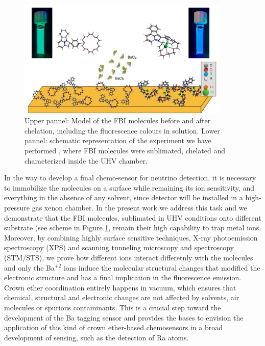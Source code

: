 \documentclass[aps,prl,reprint,longbibliography,superscriptaddress]{revtex4-1}
\def\Ba{Ba$^{+2}$ }
\begin{document}
 \begin{figure}[ht!]
	\includegraphics[width=0.9\textwidth]{figures/fig1_fbi_model.pdf}
	\caption{\label{ModeloFBI} 
    Upper pannel: Model of the FBI molecules before and after chelation, including the fluorescence colours in solution. Lower pannel: schematic representation of the experiment we have performed , where FBI molecules were sublimated, chelated and characterized inside the UHV chamber.}
\end{figure}  

 In the way to develop a final chemo-sensor for neutrino detection, it is necessary to immobilize the molecules on a surface while remaining its ion sensitivity, and everything in the absence of any solvent, since detector will be installed in a high-pressure gas xenon chamber. In the present work we address this task and we demonstrate that the FBI molecules, sublimated in UHV conditions onto different substrate (see scheme in Figure \ref{ModeloFBI}, remain their high capability to trap metal ions. Moreover, by combining highly surface sensitive techniques, X-ray photoemission spectroscopy (XPS) and scanning tunneling microscopy and spectroscopy (STM/STS), we prove how different ions interact differetnly with the molecules and only the \Ba ions induce the molecular structural changes that modified the electronic structure and has a final implication in the fluorescence emission. Crown ether coordination entirely happens in vacuum, which ensures that chemical, structural and electronic changes are not affected by solvents, air molecules or spurious contaminants. This is a crucial step toward the development of the Ba tagging sensor and provides the bases to envision the application of this kind of crown ether-based chemosensors in a broad development of sensing, such as the detection of Ra atoms.
\end{document}
